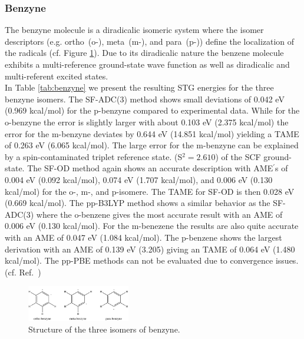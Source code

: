 \documentclass[aip,graphicx,amsmath,reprint]{revtex4-1}
\begin{document}
\subsubsection{Benzyne}
The benzyne molecule is a diradicalic isomeric system where the isomer descriptors (e.g. \mbox{ortho (o-)}, \mbox{meta (m-)}, and \mbox{para (p-)}) define the localization of the radicals (cf. Figure \ref{fig:benzyne}). Due to its diradicalic nature the benzene molecule exhibits a multi-reference ground-state wave function as well as diradicalic and multi-referent excited states.\\
In Table \ref{tab:benzyne} we present the resulting STG energies for the three benzyne isomers. The SF-ADC(3) method shows small deviations of 0.042 eV (0.969 kcal/mol) for the p-benzyne compared to experimental data. While for the o-benzyne the error is slightly larger with about 0.103 eV (2.375 kcal/mol) the error for the m-benzyne deviates by 0.644 eV (14.851 kcal/mol) yielding a TAME of 0.263 eV (6.065 kcal/mol). The large error for the m-benzyne can be explained by a spin-contaminated triplet reference state. (S$^2 = 2.610$) of the SCF ground-state. The SF-OD method again shows an accurate description with AME$^\prime$s of 0.004 eV (0.092 kcal/mol), 0.074 eV (1.707 kcal/mol), and 0.006 eV (0.130 kcal/mol) for the o-, m-, and p-isomere. The TAME for SF-OD is then 0.028 eV (0.669 kcal/mol). The pp-B3LYP method shows a similar behavior as the SF-ADC(3) where the o-benzene gives the most accurate result with an AME of 0.006 eV (0.130 kcal/mol). For the m-benezene the results are also quite accurate with an AME of  0.047 eV (1.084 kcal/mol). The p-benzene shows the largest derivation with an AME of 0.139 eV (3.205) giving an TAME of 0.064 eV (1.480 kcal/mol). The pp-PBE methods can not be evaluated due to convergence issues. (cf. Ref.~)
\begin{figure}
\includegraphics[width=0.4\textwidth]{benzyne.png}
\caption{\label{fig:benzyne}Structure of the three isomers of benzyne.}
\end{figure}
\end{document}
